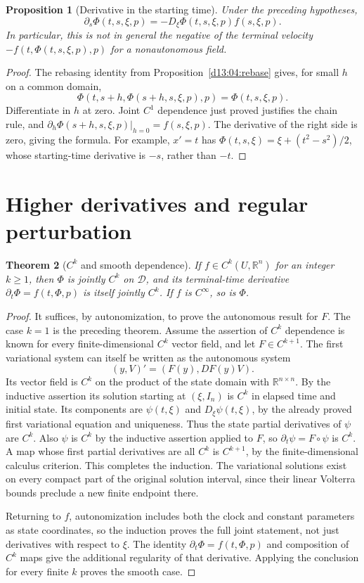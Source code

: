 \documentclass[11pt,oneside]{book}
\newtheorem{theorem}{Theorem}[chapter]
\newtheorem{proposition}[theorem]{Proposition}
\theoremstyle{definition}
\theoremstyle{remark}\newtheorem{remark}[theorem]{Remark}
\newcommand{\R}{\mathbb R}\newcommand{\C}{\mathbb C}
\begin{document}
\begin{proposition}[Derivative in the starting time]\label{d13:06:initial-time}
Under the preceding hypotheses,
\[
 \partial_s\Phi(t,s,\xi,p)
    =-D_\xi\Phi(t,s,\xi,p)f(s,\xi,p).
\]
In particular, this is not in general the negative of the terminal
velocity $-f(t,\Phi(t,s,\xi,p),p)$ for a nonautonomous field.
\end{proposition}
\begin{proof}
The rebasing identity from Proposition~\ref{d13:04:rebase} gives, for
small $h$ on a common domain,
\[
 \Phi(t,s+h,\Phi(s+h,s,\xi,p),p)=\Phi(t,s,\xi,p).
\]
Differentiate in $h$ at zero. Joint $C^1$ dependence just proved
justifies the chain rule, and
$\partial_h\Phi(s+h,s,\xi,p)|_{h=0}=f(s,\xi,p)$.
The derivative of the right side is zero, giving the formula. For
example, $x'=t$ has $\Phi(t,s,\xi)=\xi+(t^2-s^2)/2$, whose
starting-time derivative is $-s$, rather than $-t$.
\end{proof}

\section{Higher derivatives and regular perturbation}
\begin{theorem}[$C^k$ and smooth dependence]\label{d13:06:ck-dependence}
If $f\in C^k(U,\R^n)$ for an integer $k\geq1$, then $\Phi$ is
jointly $C^k$ on $\mathcal D$, and its terminal-time derivative
$\partial_t\Phi=f(t,\Phi,p)$ is itself jointly $C^k$. If $f$ is
$C^\infty$, so is $\Phi$.
\end{theorem}
\begin{proof}
It suffices, by autonomization, to prove the autonomous result for $F$.
The case $k=1$ is the preceding theorem. Assume the assertion of
$C^k$ dependence is known for every finite-dimensional $C^k$ vector
field, and let $F\in C^{k+1}$. The first variational system can itself
be written as the autonomous system
\[
 (y,V)'=(F(y),DF(y)V).
\]
Its vector field is $C^k$ on the product of the state domain with
$\R^{n\times n}$. By the inductive assertion its solution starting
at $(\xi,I_n)$ is $C^k$ in elapsed time and initial state. Its
components are $\psi(t,\xi)$ and $D_\xi\psi(t,\xi)$, by the
already proved first variational equation and uniqueness. Thus the
state partial derivatives of $\psi$ are $C^k$. Also $\psi$ is
$C^k$ by the inductive assertion applied to $F$, so
$\partial_t\psi=F\circ\psi$ is $C^k$. A map whose first partial
derivatives are all $C^k$ is $C^{k+1}$, by the finite-dimensional
calculus criterion. This completes the induction. The variational
solutions exist on every compact part of the original solution
interval, since their linear Volterra bounds preclude a new finite
endpoint there.

Returning to $f$, autonomization includes both the clock and constant
parameters as state coordinates, so the induction proves the full
joint statement, not just derivatives with respect to $\xi$.
The identity $\partial_t\Phi=f(t,\Phi,p)$ and composition of
$C^k$ maps give the additional regularity of that derivative.
Applying the conclusion for every finite $k$ proves the smooth case.
\end{proof}
\end{document}
